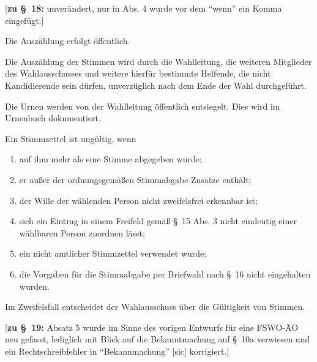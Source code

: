\documentclass[%
draft,%
multilinesections%
]{fswo}
\newcommand\bemFr[1] {{\color{Red}[#1]}}
\newcommand\bemFr[1]{}%
\begin{document}
\bemFr{\textbf{zu \S~18:} unverändert, nur in Abs. 4 wurde vor dem \enquote{wenn} ein Komma eingefügt.}
\begin{contract}
Die Auszählung erfolgt öffentlich.

Die Auszählung der Stimmen wird durch die Wahlleitung, die weiteren Mitglieder des Wahlausschusses und weitere hierfür bestimmte Helfende,
die nicht Kandidierende sein dürfen, unverzüglich nach dem Ende der Wahl durchgeführt.

Die Urnen werden von der Wahlleitung öffentlich entsiegelt. Dies wird im Urnenbuch dokumentiert.

Ein Stimmzettel ist ungültig, wenn
\begin{enumerate}
\item auf ihm mehr als eine Stimme abgegeben wurde;
\item er außer der ordnungsgemäßen Stimmabgabe Zusätze enthält;
\item der Wille der wählenden Person nicht zweifelsfrei erkennbar ist;
\item sich ein Eintrag in einem Freifeld gemäß \S~15 Abs. 3 nicht eindeutig einer wählbaren Person zuordnen lässt;
\item ein nicht amtlicher Stimmzettel verwendet wurde;
\item die Vorgaben für die Stimmabgabe per Briefwahl nach \S~16 nicht eingehalten wurden.
\end{enumerate}
Im Zweifelsfall entscheidet der Wahlausschuss über die Gültigkeit von Stimmen.
\end{contract}

\bemFr{\textbf{zu \S~19:}
Absatz 5 wurde im Sinne des vorigen Entwurfs für eine FSWO-ÄO neu gefasst, lediglich mit Blick auf die Bekanntmachung auf \S~10a verwiesen und ein Rechtschreibfehler in \enquote{Bekannmachung} [sic] korrigiert.}
\end{document}
